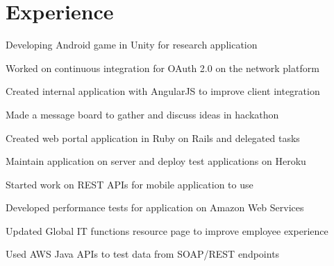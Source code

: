 \documentclass[]{deedy-resume-openfont}
\begin{document}
\begin{minipage}[t]{0.66\textwidth}


\section{Experience}

\vspace{\topsep} %
\begin{tightemize}
\item Developing Android game in Unity for research application
\end{tightemize}
\sectionsep

\begin{tightemize}
\item Worked on continuous integration for OAuth 2.0 on the network platform
\item Created internal application with AngularJS to improve client integration
\item Made a message board to gather and discuss ideas in hackathon
\end{tightemize}
\sectionsep

\begin{tightemize}
\item Created web portal application in Ruby on Rails and delegated tasks
\item Maintain application on server and deploy test applications on Heroku
\item Started work on REST APIs for mobile application to use
\end{tightemize}
\sectionsep

\begin{tightemize}
\item Developed performance tests for application on Amazon Web Services
\item Updated Global IT functions resource page to improve employee experience
\item Used AWS Java APIs to test data from SOAP/REST endpoints
\end{tightemize}
\sectionsep


\end{minipage}
\end{document}
